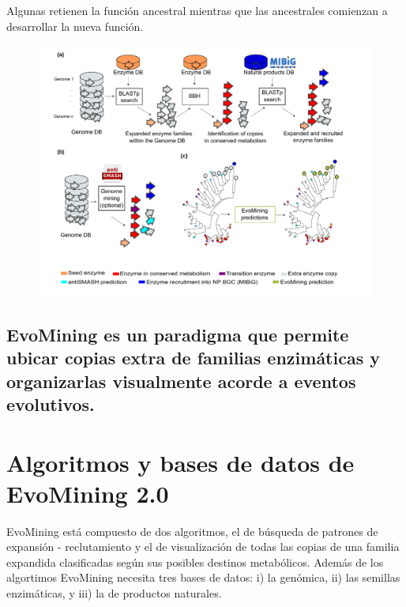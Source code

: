 \documentclass[12pt,twoside]{reedthesis}
\begin{document}
  Algunas retienen la función ancestral mientras que las ancestrales
  comienzan a desarrollar la nueva función.
  
  \begin{figure}[h!tbp]
  \centering
  \includegraphics[angle = 0,scale = .7]{chapter2/FigurasPaper/Figure1.pdf}
  \caption[EvoMining Algorithm]{\footnotesize{}}
  \label{fig:EvoMiningAlgorithms}
  \end{figure}
  
  \subsection{EvoMining es un paradigma que permite ubicar copias extra de
  familias enzimáticas y organizarlas visualmente acorde a eventos
  evolutivos.}\label{evomining-es-un-paradigma-que-permite-ubicar-copias-extra-de-familias-enzimaticas-y-organizarlas-visualmente-acorde-a-eventos-evolutivos.}
  
  \section{Algoritmos y bases de datos de EvoMining
  2.0}\label{algoritmos-y-bases-de-datos-de-evomining-2.0}
  
  EvoMining está compuesto de dos algoritmos, el de búsqueda de patrones
  de expansión - reclutamiento y el de visualización de todas las copias
  de una familia expandida clasificadas según sus posibles destinos
  metabólicos. Además de los algortimos EvoMining necesita tres bases de
  datos: i) la genómica, ii) las semillas enzimáticas, y iii) la de
  productos naturales.
  
\end{document}
